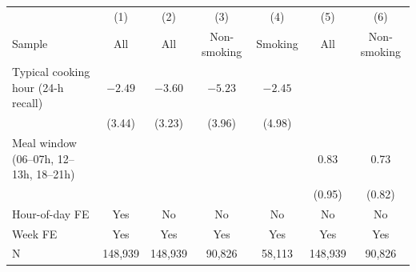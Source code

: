 \documentclass[9pt,twocolumn,twoside]{pnas-new}
\begin{document}
\begin{table}
\begin{tabular}{lcccccc}
\toprule
 & (1) & (2) & (3) & (4) & (5) & (6) \\
Sample & All & All & Non-smoking & Smoking & All & Non-smoking \\
\midrule
Typical cooking hour (24-h recall) & $-2.49$ & $-3.60$ & $-5.23$ & $-2.45$ & & \\
 & (3.44) & (3.23) & (3.96) & (4.98) & & \\
Meal window (06--07h, 12--13h, 18--21h) & & & & & 0.83 & 0.73 \\
 & & & & & (0.95) & (0.82) \\
Hour-of-day FE & Yes & No & No & No & No & No \\
Week FE & Yes & Yes & Yes & Yes & Yes & Yes \\
N & 148,939 & 148,939 & 90,826 & 58,113 & 148,939 & 90,826 \\
\bottomrule
\end{tabular}
\end{table}
\end{document}
